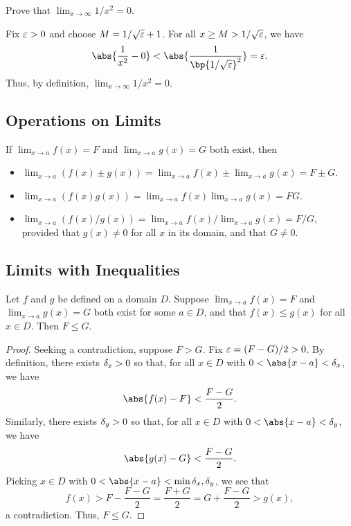 \begin{sample}
    Prove that $\lim_{x \to \infty} 1/x^2 = 0$.
\end{sample}
\begin{sampans}
    Fix $\varepsilon > 0$ and choose $M = 1/\sqrt{\varepsilon} + 1$. For all $x \geq M > 1/\sqrt{\varepsilon}$, we have \[\abs{\frac1{x^2} - 0} < \abs{\frac1{\bp{1/\sqrt{\ve}}^2}} = \ve.\] Thus, by definition, $\lim_{x \to \infty} 1/x^2 = 0$.
\end{sampans}

\clearpage
\subsection{Operations on Limits}

\begin{fact}
    If $\displaystyle\lim_{x \to a} f(x) = F$ and $\displaystyle\lim_{x \to a} g(x) = G$ both exist, then
    \begin{itemize}
        \item $\displaystyle\lim_{x \to a} (f(x) \pm g(x)) = \lim_{x \to a} f(x) \pm \lim_{x \to a} g(x) = F \pm G$.
        \item $\displaystyle\lim_{x \to a} (f(x) g(x)) = \lim_{x \to a} f(x) \lim_{x \to a} g(x) = FG$.
        \item $\displaystyle\lim_{x \to a} (f(x)/g(x)) = \lim_{x \to a} f(x) / \lim_{x \to a} g(x) = F/G$, provided that $g(x) \neq 0$ for all $x$ in its domain, and that $G \neq 0$.
    \end{itemize}
\end{fact}

\subsection{Limits with Inequalities}

\begin{proposition}
    Let $f$ and $g$ be defined on a domain $D$. Suppose $\lim_{x \to a} f(x) = F$ and $\lim_{x \to a} g(x) = G$ both exist for some $a \in D$, and that $f(x) \leq g(x)$ for all $x \in D$. Then $F \leq G$.
\end{proposition}
\begin{proof}
    Seeking a contradiction, suppose $F > G$. Fix $\varepsilon = (F-G)/2 > 0$. By definition, there exists $\delta_x > 0$ so that, for all $x \in D$ with $0 < \abs{x-a} < \de_x$, we have \[\abs{f(x) - F} < \frac{F-G}{2}.\] Similarly, there exists $\delta_y > 0$ so that, for all $x \in D$ with $0 < \abs{x-a} < \de_y$, we have \[\abs{g(x) - G} < \frac{F-G}{2}.\] Picking $x \in D$ with $0 < \abs{x - a} < \min{\de_x, \de_y}$, we see that \[f(x) > F - \frac{F-G}{2} = \frac{F+G}{2} = G + \frac{F-G}{2} > g(x),\] a contradiction. Thus, $F \leq G$.
\end{proof}

